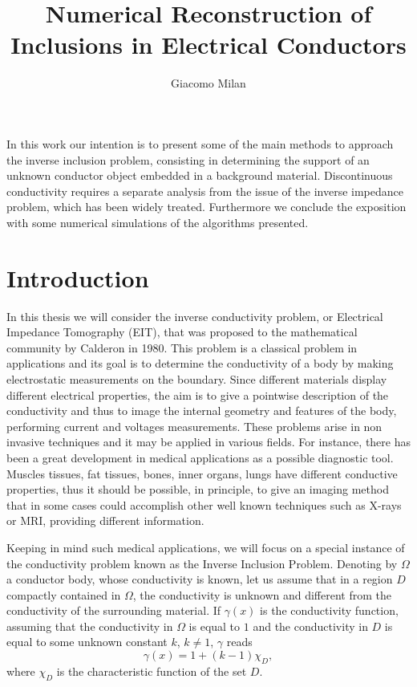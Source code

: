 \documentclass[10pt, a4paper, twoside, openright]{book}
\title{Numerical Reconstruction of Inclusions in Electrical Conductors}
\author{Giacomo Milan}
\theoremstyle{definition}
\theoremstyle{plain}
\theoremstyle{plain}
\theoremstyle{plain}
\theoremstyle{plain}
\theoremstyle{plain}
\theoremstyle{plain}
\theoremstyle{plain}
\theoremstyle{plain}
\newcommand{\fncyblank}{\fancyhf{}}
\newenvironment{abstract} %
{\cleardoublepage\fncyblank\null\vfill\begin{center} %
\bfseries\abstractname\end{center}} %
{\vfill\null}
\begin{document}
\maketitle
\tableofcontents
\listoffigures

\begin{abstract}
 In this work our intention is to present some of the main methods to approach the inverse 
 inclusion problem, consisting in determining the support of an unknown conductor 
 object embedded in a background material. Discontinuous conductivity requires a separate 
 analysis from the issue of the inverse impedance problem, which has been widely treated. 
 Furthermore we conclude the exposition with some numerical simulations of the algorithms 
 presented.
\end{abstract}


\chapter{Introduction}
In this thesis we will consider the inverse conductivity problem, or Electrical Impedance Tomography (EIT),
that was proposed to the mathematical community by Calderon \cite{Ca} in 1980.
This problem is a classical problem in applications and its goal is to determine the conductivity of a body by making electrostatic
measurements on the boundary. Since different materials display different electrical properties, the aim is to give a pointwise
description of the conductivity and thus to image the internal geometry and features of the body, performing current and voltages measurements.
These problems arise in non invasive techniques and it may be applied in various fields. For instance, there has been a
great development in medical applications as a possible diagnostic tool.
Muscles tissues, fat tissues, bones, inner organs, lungs have different conductive properties, thus it should be possible, in principle,
to give an imaging method that in some cases could accomplish other well known techniques such as X-rays or MRI, providing different information.

Keeping in mind such medical applications, we will focus on a special instance of the conductivity problem known as the Inverse Inclusion Problem.
Denoting by $\Omega$ a conductor body, whose conductivity is known, let us assume that in a region $D$ compactly contained in $\Omega$,
the conductivity is unknown and different from the conductivity of the surrounding material. If $\gamma(x)$ is the conductivity function,
assuming that the conductivity in $\Omega$ is equal to $1$ and the conductivity in $D$ is equal to some unknown constant $k$, $k\neq1$,
$\gamma$ reads
$$\gamma(x)=1+(k-1)\chi_D,$$
where $\chi_D$ is the characteristic function of the set $D$.
\end{document}
